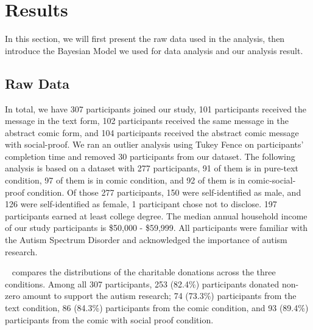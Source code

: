 \section{Results}
\label{sec:Study on Behavior Results}

In this section, we will first present the raw data used in the analysis, then introduce the Bayesian Model we used for data analysis and our analysis result.

\subsection{Raw Data}
\label{sub:Study on Behavior Raw Data}
In total, we have 307 participants joined our study, 101 participants received the message in the text form, 102 participants received the same message in the abstract comic form, and 104 participants received the abstract comic message with social-proof. We ran an outlier analysis using Tukey Fence on participants' completion time and removed 30 participants from our dataset. The following analysis is based on a dataset with 277 participants, 91 of them is in pure-text condition, 97 of them is in comic condition, and 92 of them is in comic-social-proof condition. Of those 277 participants, 150 were self-identified as male, and 126 were self-identified as female, 1 participant chose not to disclose. 197 participants earned at least college degree. The median annual household income of our study participants is \$50,000 - \$59,999.  All participants were familiar with the Autism Spectrum Disorder and acknowledged the importance of autism research. 

~ compares the distributions of the charitable donations across the three conditions. Among all 307 participants, 253 (82.4\%) participants donated non-zero amount to support the autism research; 74 (73.3\%) participants from the text condition, 86 (84.3\%) participants from the comic condition, and 93 (89.4\%) participants from the comic with social proof condition.


